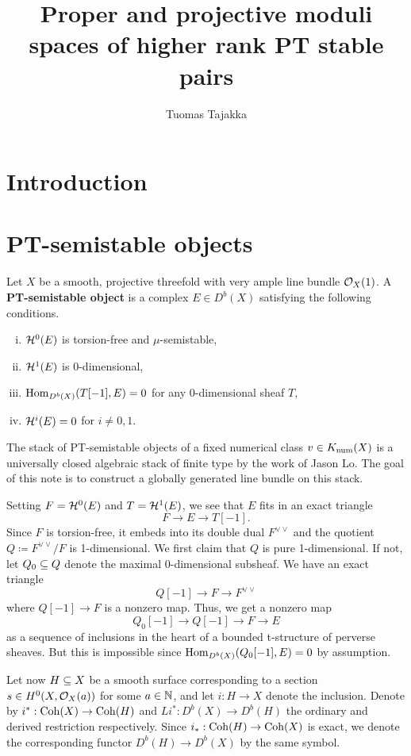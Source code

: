 \documentclass[letterpaper,10pt]{article}
\title{Proper and projective moduli spaces of higher rank PT stable pairs}
\author{Tuomas Tajakka}
\date{}
\theoremstyle{remark}
\begin{document}
\maketitle

\section{Introduction}

\section{PT-semistable objects}
Let $X$ be a smooth, projective threefold with very ample line bundle $\mathcal{O}_X(1)$. A \textbf{PT-semistable object} is a complex $E \in D^b(X)$ satisfying the following conditions.
\begin{enumerate}[(i)]
    \item $\mathcal{H}^0(E)$ is torsion-free and $\mu$-semistable,
    \item $\mathcal{H}^1(E)$ is 0-dimensional,
    \item $\mathrm{Hom}_{D^b(X)}(T[-1], E) = 0$ for any 0-dimensional sheaf $T$,
    \item $\mathcal{H}^i(E) = 0$ for $i \neq 0, 1$.
\end{enumerate}
The stack of PT-semistable objects of a fixed numerical class $v \in K_{\mathrm{num}}(X)$ is a universally closed algebraic stack of finite type by the work of Jason Lo. The goal of this note is to construct a globally generated line bundle on this stack.

Setting $F = \mathcal{H}^0(E)$ and $T = \mathcal{H}^1(E)$, we see that $E$ fits in an exact triangle
\[ F \to E \to T[-1]. \]
Since $F$ is torsion-free, it embeds into its double dual $F^{\vee\vee}$ and the quotient $Q \coloneqq F^{\vee\vee}/F$ is 1-dimensional. We first claim that $Q$ is pure 1-dimensional. If not, let $Q_0 \subseteq Q$ denote the maximal 0-dimensional subsheaf. We have an exact triangle
\[ Q[-1] \to F \to F^{\vee\vee} \]
where $Q[-1] \to F$ is a nonzero map. Thus, we get a nonzero map
\[ Q_0[-1] \to Q[-1] \to F \to E \]
as a sequence of inclusions in the heart of a bounded t-structure of perverse sheaves. But this is impossible since $\mathrm{Hom}_{D^b(X)}(Q_0[-1], E) = 0$ by assumption.

Let now $H \subseteq X$ be a smooth surface corresponding to a section $s \in H^0(X, \mathcal{O}_X(a))$ for some $a \in \mathbb{N}$, and let $i: H \to X$ denote the inclusion. Denote by $i^*: \mathrm{Coh}(X) \to \mathrm{Coh}(H)$ and $Li^*: D^b(X) \to D^b(H)$ the ordinary and derived restriction respectively. Since $i_*: \mathrm{Coh}(H) \to \mathrm{Coh}(X)$ is exact, we denote the corresponding functor $D^b(H) \to D^b(X)$ by the same symbol.
\end{document}

